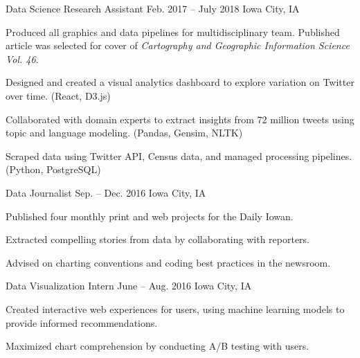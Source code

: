 \begin{cventries}
    {Data Science Research Assistant}
    {Feb. 2017 -- July 2018}
    {Iowa City, IA}
    {%
      \begin{cvitems}
        \item {Produced all graphics and data pipelines for multidisciplinary team. Published article was selected for cover of \textit{Cartography and Geographic Information Science Vol. 46}.}
        \item {Designed and created a visual analytics dashboard to explore variation on Twitter over time. (React, D3.js)}
        \item {Collaborated with domain experts to extract insights from 72 million tweets using topic and language modeling. (Pandas, Gensim, NLTK)}
        \item{Scraped data using Twitter API, Census data, and managed processing pipelines. (Python, PostgreSQL)}
      \end{cvitems}
    }

    {Data Journalist}
    {Sep. -- Dec. 2016}
    {Iowa City, IA}
    {%
      \begin{cvitems}
        \item{Published four monthly print and web projects for the Daily Iowan.}
        \item{Extracted compelling stories from data by collaborating with reporters.}
        \item{Advised on charting conventions and coding best practices in the newsroom.}
      \end{cvitems}
    }

    {Data Visualization Intern}
    {June -- Aug. 2016}
    {Iowa City, IA}
    {%
      \begin{cvitems}
        \item{Created interactive web experiences for users, using machine learning models to provide informed recommendations.}
        \item{Maximized chart comprehension by conducting A/B testing with users.}
      \end{cvitems}
    }
\end{cventries}
